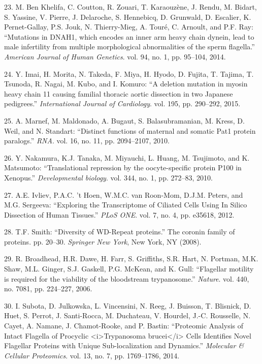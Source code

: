 \documentclass[12pt,twoside]{reedthesis}
\theoremstyle{definition}
\theoremstyle{definition}
\theoremstyle{remark}
\begin{document}
  \hypertarget{ref-BenKhelifa2014}{}
  23. M. Ben Khelifa, C. Coutton, R. Zouari, T. Karaouzène, J. Rendu, M.
  Bidart, S. Yassine, V. Pierre, J. Delaroche, S. Hennebicq, D. Grunwald,
  D. Escalier, K. Pernet-Gallay, P.S. Jouk, N. Thierry-Mieg, A. Touré, C.
  Arnoult, and P.F. Ray: ``Mutations in DNAH1, which encodes an inner arm
  heavy chain dynein, lead to male infertility from multiple morphological
  abnormalities of the sperm flagella.'' \emph{American Journal of Human
  Genetics}. vol. 94, no. 1, pp. 95--104, 2014.
  
  \hypertarget{ref-Imai2015}{}
  24. Y. Imai, H. Morita, N. Takeda, F. Miya, H. Hyodo, D. Fujita, T.
  Tajima, T. Tsunoda, R. Nagai, M. Kubo, and I. Komuro: ``A deletion
  mutation in myosin heavy chain 11 causing familial thoracic aortic
  dissection in two Japanese pedigrees.'' \emph{International Journal of
  Cardiology}. vol. 195, pp. 290--292, 2015.
  
  \hypertarget{ref-Marnef2010}{}
  25. A. Marnef, M. Maldonado, A. Bugaut, S. Balasubramanian, M. Kress, D.
  Weil, and N. Standart: ``Distinct functions of maternal and somatic Pat1
  protein paralogs.'' \emph{RNA}. vol. 16, no. 11, pp. 2094--2107, 2010.
  
  \hypertarget{ref-Nakamura2010}{}
  26. Y. Nakamura, K.J. Tanaka, M. Miyauchi, L. Huang, M. Tsujimoto, and
  K. Matsumoto: ``Translational repression by the oocyte-specific protein
  P100 in Xenopus.'' \emph{Developmental biology}. vol. 344, no. 1, pp.
  272--83, 2010.
  
  \hypertarget{ref-Ivliev2012}{}
  27. A.E. Ivliev, P.A.C. 't Hoen, W.M.C. van Roon-Mom, D.J.M. Peters, and
  M.G. Sergeeva: ``Exploring the Transcriptome of Ciliated Cells Using In
  Silico Dissection of Human Tissues.'' \emph{PLoS ONE}. vol. 7, no. 4,
  pp. e35618, 2012.
  
  \hypertarget{ref-Smith2008}{}
  28. T.F. Smith: ``Diversity of WD-Repeat proteins.'' The coronin family
  of proteins. pp. 20--30. \emph{Springer New York}, New York, NY (2008).
  
  \hypertarget{ref-Broadhead2006}{}
  29. R. Broadhead, H.R. Dawe, H. Farr, S. Griffiths, S.R. Hart, N.
  Portman, M.K. Shaw, M.L. Ginger, S.J. Gaskell, P.G. McKean, and K. Gull:
  ``Flagellar motility is required for the viability of the bloodstream
  trypanosome.'' \emph{Nature}. vol. 440, no. 7081, pp. 224--227, 2006.
  
  \hypertarget{ref-Subota2014}{}
  30. I. Subota, D. Julkowska, L. Vincensini, N. Reeg, J. Buisson, T.
  Blisnick, D. Huet, S. Perrot, J. Santi-Rocca, M. Duchateau, V. Hourdel,
  J.-C. Rousselle, N. Cayet, A. Namane, J. Chamot-Rooke, and P. Bastin:
  ``Proteomic Analysis of Intact Flagella of Procyclic
  \textless{}i\textgreater{}Trypanosoma brucei\textless{}/i\textgreater{}
  Cells Identifies Novel Flagellar Proteins with Unique Sub-localization
  and Dynamics.'' \emph{Molecular \& Cellular Proteomics}. vol. 13, no. 7,
  pp. 1769--1786, 2014.


\end{document}
